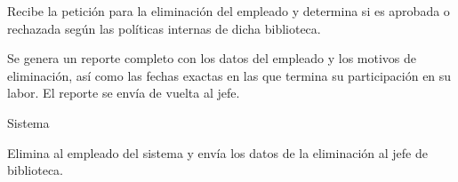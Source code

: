 \begin{PDescripcion}
\begin{enumerate}
      \Ppaso[\itarea] Recibe la petición para la eliminación del empleado y determina si es aprobada
o rechazada según las políticas internas de dicha biblioteca.

\Ppaso[\itarea] Se genera un reporte completo con los datos del empleado y los motivos de eliminación, así como las fechas exactas en las que termina su participación en su labor. El reporte se envía de vuelta al jefe.

    \end{enumerate}    
    
  \Ppaso Sistema

    \begin{enumerate}

      \Ppaso[\itarea] Elimina al empleado del sistema y envía los datos de la eliminación al jefe de biblioteca.  
    
    \end{enumerate} 
        
\end{PDescripcion}


